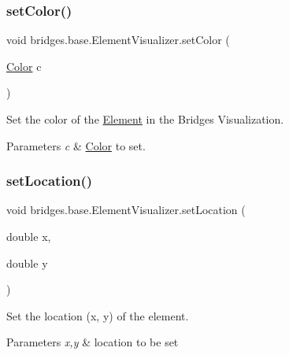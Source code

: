 \subsubsection{\texorpdfstring{setColor()}{setColor()}\hspace{0.1cm}{\footnotesize\ttfamily [3/3]}}
{\footnotesize\ttfamily void bridges.\+base.\+Element\+Visualizer.\+set\+Color (\begin{DoxyParamCaption}\item[{\mbox{\hyperlink{classbridges_1_1base_1_1_color}{Color}}}]{c }\end{DoxyParamCaption})}



Set the color of the \mbox{\hyperlink{classbridges_1_1base_1_1_element}{Element}} in the Bridges Visualization. 


\begin{DoxyParams}{Parameters}
{\em c} & \mbox{\hyperlink{classbridges_1_1base_1_1_color}{Color}} to set. \\
\hline
\end{DoxyParams}
\mbox{\label{classbridges_1_1base_1_1_element_visualizer_a04f3416447f2042de7cd21ce5b6a0598}} 
\subsubsection{\texorpdfstring{setLocation()}{setLocation()}}
{\footnotesize\ttfamily void bridges.\+base.\+Element\+Visualizer.\+set\+Location (\begin{DoxyParamCaption}\item[{double}]{x,  }\item[{double}]{y }\end{DoxyParamCaption})}



Set the location (x, y) of the element. 


\begin{DoxyParams}{Parameters}
{\em x,y} & location to be set \\
\hline
\end{DoxyParams}
\mbox{\label{classbridges_1_1base_1_1_element_visualizer_a932f62eb1bd0c92da265a7f903dd0790}} 
